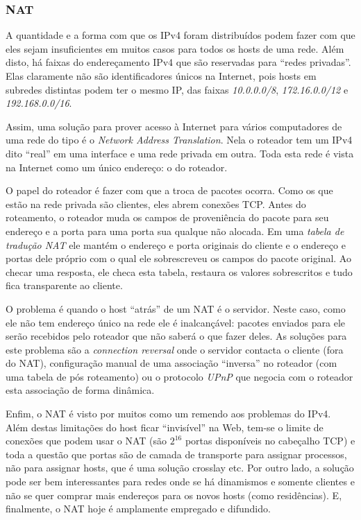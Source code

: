 \subsubsection{NAT}

A quantidade e a forma com que os IPv4 foram distribuídos podem fazer com que eles sejam insuficientes em muitos casos para todos os hosts de uma rede.
Além disto, há faixas do endereçamento IPv4 que são reservadas para ``redes privadas''.
Elas claramente não são identificadores únicos na Internet, pois hosts em subredes distintas podem ter o mesmo IP,
das faixas \emph{10.0.0.0/8}, \emph{172.16.0.0/12} e \emph{192.168.0.0/16}.

Assim, uma solução para prover acesso à Internet para vários computadores de uma rede do tipo é o \emph{Network Address Translation}.
Nela o roteador tem um IPv4 dito ``real'' em uma interface e uma rede privada em outra. 
Toda esta rede é vista na Internet como um único endereço: o do roteador.

O papel do roteador é fazer com que a troca de pacotes ocorra. Como os que estão na rede privada são clientes, eles abrem conexões TCP.
Antes do roteamento, o roteador muda os campos de proveniência do pacote para seu endereço e a porta para uma porta sua qualque não alocada.
Em uma \emph{tabela de tradução NAT} ele mantém o endereço e porta originais do cliente e o endereço e portas dele próprio com o qual ele sobrescreveu os campos do pacote original.
Ao checar uma resposta, ele checa esta tabela, restaura os valores sobrescritos e tudo fica transparente ao cliente.

O problema é quando o host ``atrás'' de um NAT é o servidor. 
Neste caso, como ele não tem endereço único na rede ele é inalcançável: pacotes enviados para ele serão recebidos pelo roteador que não saberá o que fazer deles.
As soluções para este problema são a \emph{connection reversal} onde o servidor contacta o cliente (fora do NAT), 
configuração manual de uma associação ``inversa'' no roteador (com uma tabela de pós roteamento) 
ou o protocolo \emph{UPnP} que negocia com o roteador esta associação de forma dinâmica.

Enfim, o NAT é visto por muitos como um remendo aos problemas do IPv4. 
Além destas limitações do host ficar ``invisível'' na Web, tem-se o limite de conexões que podem usar o NAT (são $2^{16}$ portas disponíveis no cabeçalho TCP) e toda a questão que portas são de camada de transporte para assignar processos, não para assignar hosts, que é uma solução crosslay etc.
Por outro lado, a solução pode ser bem interessantes para redes onde se há dinamismos e somente clientes e não se quer comprar mais endereços para os novos hosts (como residências).
E, finalmente, o NAT hoje é amplamente empregado e difundido.

